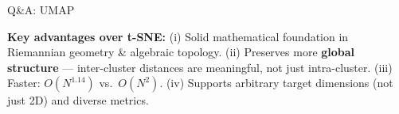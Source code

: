 \documentclass[aspectratio=169]{beamer}
\begin{document}
\begin{frame}{Q\&A: UMAP}

\vspace{0.2cm}
\begin{tcolorbox}[colback=metalight, colframe=metablue, boxrule=0.5pt, arc=4pt,
    left=4pt, right=4pt, top=3pt, bottom=3pt]
\small
\textbf{Key advantages over t-SNE:} (i) Solid mathematical foundation in Riemannian geometry \& algebraic topology. (ii) Preserves more \textbf{global structure} --- inter-cluster distances are meaningful, not just intra-cluster. (iii) Faster: $O(N^{1.14})$ vs.\ $O(N^2)$. (iv) Supports arbitrary target dimensions (not just 2D) and diverse metrics.
\end{tcolorbox}
\end{frame}
\end{document}
